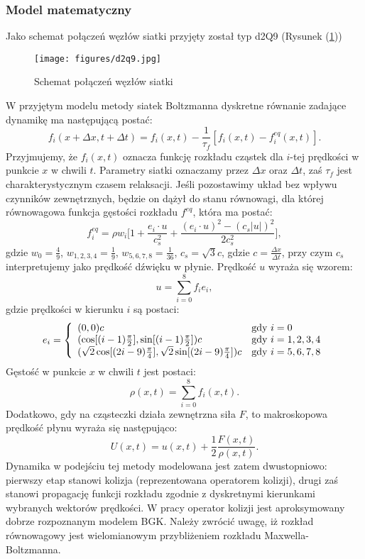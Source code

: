 \documentclass[12pt]{article}
\begin{document}
\subsubsection{Model matematyczny}
Jako schemat połączeń węzłów siatki przyjęty został typ d2Q9 (Rysunek (\ref{Fig26}))
\begin{figure}[H]
	\texttt{[image: figures/d2q9.jpg]} 
	\centering
	\caption{Schemat połączeń węzłów siatki}
	\label{Fig26}
\end{figure}
W przyjętym modelu metody siatek Boltzmanna dyskretne równanie zadające dynamikę ma następującą postać:
\begin{equation}
f_{i}(x + \Delta x, t + \Delta t) = f_{i}(x,t) - \frac{1}{\tau_f}[f_{i}(x,t) - f_{i}^{eq}(x,t)].
\end{equation}
Przyjmujemy, że $f_{i}(x,t)$ oznacza funkcję rozkładu cząstek dla $i$-tej prędkości w punkcie $x$ w chwili $t$. Parametry siatki oznaczamy przez $\Delta x$ oraz $\Delta t$, zaś $\tau_f$ jest charakterystycznym czasem relaksacji.
Jeśli pozostawimy układ bez wpływu czynników zewnętrznych, będzie on dążył do stanu równowagi, dla której równowagowa funkcja gęstości rozkładu $f^{eq}$, która ma postać:
\begin{equation}
f_{i}^{eq} = \rho w_{i} \Bigg[1 + \frac{e_i \cdot u}{c_{s}^{2}} + 
\frac{(e_i \cdot u)^2 - (c_s|u|)^2}{2 c_{s}^{2}}\Bigg],
\end{equation}
gdzie $w_0 = \frac{4}{9}$, $w_{1,2,3,4} = \frac{1}{9}$, $w_{5,6,7,8} = \frac{1}{36}$, $c_s = \sqrt{3}c$, gdzie $c = \frac{\Delta x}{\Delta t}$, przy czym $c_s$ interpretujemy jako prędkość dźwięku w płynie. Prędkość $u$ wyraża się wzorem:
\begin{equation}
u = \sum_{i=0}^{8}f_{i}e_{i},
\end{equation}
gdzie prędkości w kierunku $i$ są postaci:
\begin{equation}
e_i = \left\{ \begin{array}{ll}
(0,0)c & \textrm{gdy $i = 0$}\\
(\cos[(i-1)\frac{\pi}{2}], \sin[(i-1)\frac{\pi}{2}])c & \textrm{gdy $i=1,2,3,4$}\\
(\sqrt{2}\cos[(2i-9)\frac{\pi}{4}],\sqrt{2}\sin[(2i-9)\frac{\pi}{4}])c & \textrm{gdy $ i=5,6,7,8 $}
\end{array} \right.
\end{equation}
Gęstość w punkcie $x$ w chwili $t$ jest postaci:
\begin{equation}
\rho(x,t) = \sum_{i=0}^{8}f_{i}(x,t).
\end{equation}
Dodatkowo, gdy na cząsteczki działa zewnętrzna siła $F$, to makroskopowa prędkość płynu wyraża się następująco:
\begin{equation}
U(x,t) = u(x,t) + \frac{1}{2}\frac{F(x,t)}{\rho(x,t)}.
\end{equation}
Dynamika w podejściu tej metody modelowana jest zatem dwustopniowo: pierwszy etap stanowi kolizja (reprezentowana operatorem kolizji), drugi zaś stanowi propagację funkcji rozkładu zgodnie z dyskretnymi kierunkami wybranych wektorów prędkości. W pracy operator kolizji jest aproksymowany dobrze rozpoznanym modelem BGK. Należy zwrócić uwagę, iż rozkład równowagowy jest wielomianowym przybliżeniem rozkładu Maxwella-Boltzmanna.\newline
\end{document}
